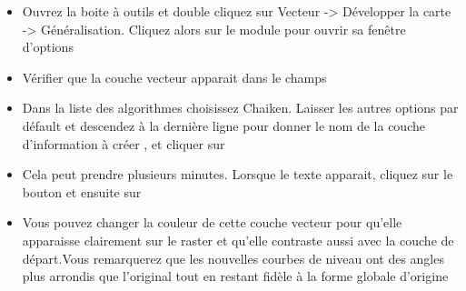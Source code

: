 \begin{itemize}[label=--]
\item Ouvrez la boite à outils \grass et double cliquez sur Vecteur -> Développer la carte -> Généralisation. Cliquez alors sur le module  pour ouvrir sa fenêtre d'options
\item Vérifier que la couche vecteur  apparait dans le champs\\ 
\item Dans la liste des algorithmes choisissez Chaiken. Laisser les autres options par défault et descendez à la dernière ligne pour donner le nom de la couche d'information à créer  , et cliquer sur 
\item Cela peut prendre plusieurs minutes. Lorsque le texte  apparait, cliquez sur le bouton  et ensuite sur 
\item Vous pouvez changer la couleur de cette couche vecteur pour qu'elle apparaisse clairement sur le raster et qu'elle contraste aussi avec la couche de départ.Vous remarquerez que les nouvelles courbes de niveau ont des angles plus arrondis que l'original tout en restant fidèle à la forme globale d'origine
\end{itemize}

